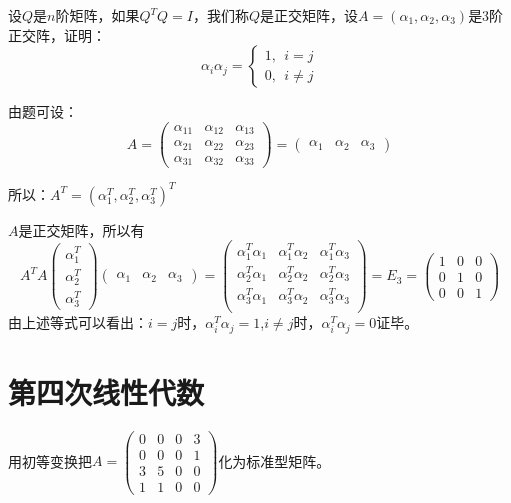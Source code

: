 \documentclass[a4paper]{report}
\begin{document}
\EX 设$Q$是$n$阶矩阵，如果$Q^TQ=I$，我们称$Q$是正交矩阵，设$A=(\alpha_1,\alpha_2,\alpha_3)$是3阶正交阵，证明：
\begin{equation*}
\alpha_i\alpha_j=
\begin{cases}
1,~~i=j\\
0,~~i\neq j
\end{cases}
\end{equation*}

\begin{zhengming}
由题可设：
\begin{equation*}
A=
\begin{pmatrix}
\alpha_{11}&\alpha_{12}&\alpha_{13}\\
\alpha_{21}&\alpha_{22}&\alpha_{23}\\
\alpha_{31}&\alpha_{32}&\alpha_{33}
\end{pmatrix}=
\begin{pmatrix}
\alpha_1&\alpha_2&\alpha_3
\end{pmatrix}
\end{equation*}

所以：$A^T=(\alpha_1^T,\alpha_2^T,\alpha_3^T)^T$

$A$是正交矩阵，所以有
\begin{equation*}A^TA
\begin{pmatrix}
\alpha_1^T\\ \alpha_2^T\\ \alpha_3^T
\end{pmatrix}\begin{pmatrix}
\alpha_1&\alpha_2&\alpha_3
\end{pmatrix}=
\begin{pmatrix}
\alpha_1^T\alpha_1&\alpha_1^T\alpha_2&\alpha_1^T\alpha_3\\
\alpha_2^T\alpha_1&\alpha_2^T\alpha_2&\alpha_2^T\alpha_3\\
\alpha_3^T\alpha_1&\alpha_3^T\alpha_2&\alpha_3^T\alpha_3\\
\end{pmatrix}=E_3=
\begin{pmatrix}
1&0&0\\
0&1&0\\
0&0&1
\end{pmatrix}
\end{equation*}
由上述等式可以看出：$i=j$时，$\alpha_i^T\alpha_j=1$,$i\neq j$时，$\alpha_i^T\alpha_j=0$证毕。
\end{zhengming}


\clearpage
\section{第四次线性代数}
\EX 用初等变换把$
A=
\begin{pmatrix}
0&0&0&3\\
0&0&0&1\\
3&5&0&0\\
1&1&0&0
\end{pmatrix}
$化为标准型矩阵。
\end{document}
